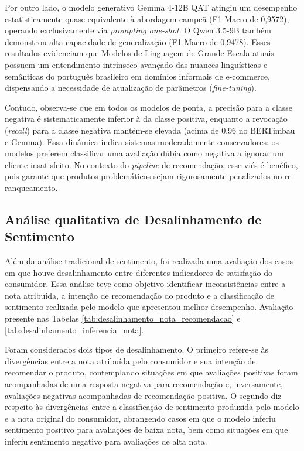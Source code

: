 \documentclass{IEEEtran}
\begin{document}
Por outro lado, o modelo generativo Gemma 4-12B QAT atingiu um desempenho estatisticamente quase equivalente à abordagem campeã (F1-Macro de 0,9572), operando exclusivamente via \textit{prompting one-shot}. O Qwen 3.5-9B também demonstrou alta capacidade de generalização (F1-Macro de 0,9478). Esses resultados evidenciam que Modelos de Linguagem de Grande Escala atuais possuem um entendimento intrínseco avançado das nuances linguísticas e semânticas do português brasileiro em domínios informais de e-commerce, dispensando a necessidade de atualização de parâmetros (\textit{fine-tuning}). 

Contudo, observa-se que em todos os modelos de ponta, a precisão para a classe negativa é sistematicamente inferior à da classe positiva, enquanto a revocação (\textit{recall}) para a classe negativa mantém-se elevada (acima de 0,96 no BERTimbau e Gemma). Essa dinâmica indica sistemas moderadamente conservadores: os modelos preferem classificar uma avaliação dúbia como negativa a ignorar um cliente insatisfeito. No contexto do \textit{pipeline} de recomendação, esse viés é benéfico, pois garante que produtos problemáticos sejam rigorosamente penalizados no re-ranqueamento.~

\subsection{Análise qualitativa de Desalinhamento de Sentimento}

Além da análise tradicional de sentimento, foi realizada uma avaliação dos casos em que houve desalinhamento entre diferentes indicadores de satisfação do consumidor. Essa análise teve como objetivo identificar inconsistências entre a nota atribuída, a intenção de recomendação do produto e a classificação de sentimento realizada pelo modelo que apresentou melhor desempenho. Avaliação presente nas Tabelas \ref{tab:desalinhamento_nota_recomendacao} e \ref{tab:desalinhamento_inferencia_nota}.

Foram considerados dois tipos de desalinhamento. 
O primeiro refere-se às divergências entre a nota atribuída pelo consumidor e sua intenção de recomendar o produto, contemplando situações em que avaliações positivas foram acompanhadas de uma resposta negativa para recomendação e, inversamente, avaliações negativas acompanhadas de recomendação positiva. 
O segundo diz respeito às divergências entre a classificação de sentimento produzida pelo modelo e a nota original do consumidor, abrangendo casos em que o modelo inferiu sentimento positivo para avaliações de baixa nota, bem como situações em que inferiu sentimento negativo para avaliações de alta nota. 
\end{document}
